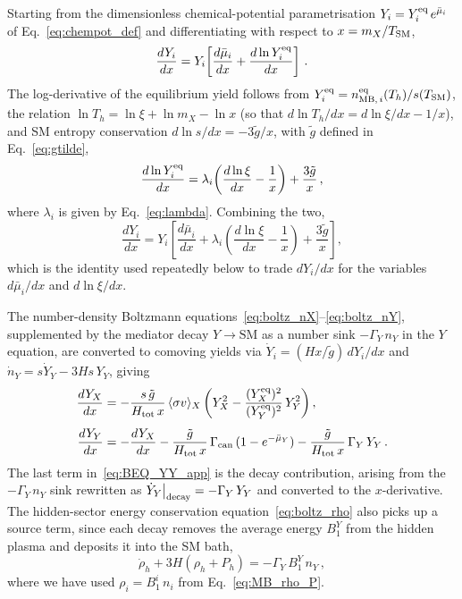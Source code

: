 \documentclass[11pt]{article}
\numberwithin{equation}{section}
\newcommand{\sigmav}{\langle\sigma v\rangle}
\newcommand{\TD}{T_h}
\begin{document}
Starting from the dimensionless chemical-potential parametrisation $Y_i = Y_i^{\rm eq}\,e^{\bar\mu_i}$ of Eq.~\eqref{eq:chempot_def} and differentiating with respect to $x = m_X/T_{\rm SM}$,
\begin{equation}
  \frac{dY_i}{dx} = Y_i\!\left[\frac{d\bar\mu_i}{dx} + \frac{d\ln Y_i^{\rm eq}}{dx}\right]\,.
\end{equation}
The log-derivative of the equilibrium yield follows from $Y_i^{\rm eq} = n^{\rm eq}_{{\rm MB},\,i}(\TD)/s(T_{\rm SM})$, the relation $\ln\TD = \ln\xi + \ln m_X - \ln x$ (so that $d\ln\TD/dx = d\ln\xi/dx - 1/x$), and SM entropy conservation $d\ln s/dx = -3\tilde g/x$, with $\tilde g$ defined in Eq.~\eqref{eq:gtilde},
\begin{equation}
  \frac{d\ln Y_i^{\rm eq}}{dx}
  = \lambda_i\!\left(\frac{d\ln\xi}{dx} - \frac{1}{x}\right) + \frac{3\tilde g}{x}\,,
  \label{eq:dlnYeq_app}
\end{equation}
where $\lambda_i$ is given by Eq.~\eqref{eq:lambda}. Combining the two,
\begin{equation}
  \frac{dY_i}{dx} = Y_i\!\left[\frac{d\bar\mu_i}{dx} + \lambda_i\!\left(\frac{d\ln\xi}{dx} - \frac{1}{x}\right) + \frac{3\tilde g}{x}\right],
  \label{eq:dYi_chempot}
\end{equation}
which is the identity used repeatedly below to trade $dY_i/dx$ for the variables $d\bar\mu_i/dx$ and $d\ln\xi/dx$.
 
The number-density Boltzmann equations~\eqref{eq:boltz_nX}--\eqref{eq:boltz_nY}, supplemented by the mediator decay $Y\to\mathrm{SM}$ as a number sink $-\Gamma_Y\,n_Y$ in the $Y$ equation, are converted to comoving yields via $\dot Y_i = (Hx/\tilde g)\,dY_i/dx$ and $\dot n_Y = s\dot Y_Y - 3Hs\,Y_Y$, giving
\begin{align}
  \frac{dY_X}{dx}
    &= -\frac{s\,\tilde g}{H_{\rm tot}\,x}\,\sigmav_X\left(Y_X^2 - \frac{(Y_X^{\rm eq})^2}{(Y_Y^{\rm eq})^2}\,Y_Y^2\right), \label{eq:BEQ_YX_app}\\[4pt]
  \frac{dY_Y}{dx}
    &= -\frac{dY_X}{dx} - \frac{\tilde g}{H_{\rm tot}\,x}\,\Gamma_{\rm can}\,(1 - e^{-\bar\mu_Y}) - \frac{\tilde g}{H_{\rm tot}\,x}\,\Gamma_Y\,Y_Y\,.
  \label{eq:BEQ_YY_app}
\end{align}
The last term in~\eqref{eq:BEQ_YY_app} is the decay contribution, arising from the $-\Gamma_Y\,n_Y$ sink rewritten as $\dot Y_Y\big|_{\rm decay} = -\Gamma_Y\,Y_Y$ and converted to the $x$-derivative. The hidden-sector energy conservation equation~\eqref{eq:boltz_rho} also picks up a source term, since each decay removes the average energy $B_1^Y$ from the hidden plasma and deposits it into the SM bath,
\begin{equation}
  \dot\rho_h + 3H(\rho_h + P_h) = -\Gamma_Y\,B_1^Y\,n_Y\,,
  \label{eq:energy_cons_app}
\end{equation}
where we have used $\rho_i = B_1^i\,n_i$ from Eq.~\eqref{eq:MB_rho_P}.
 
\end{document}
